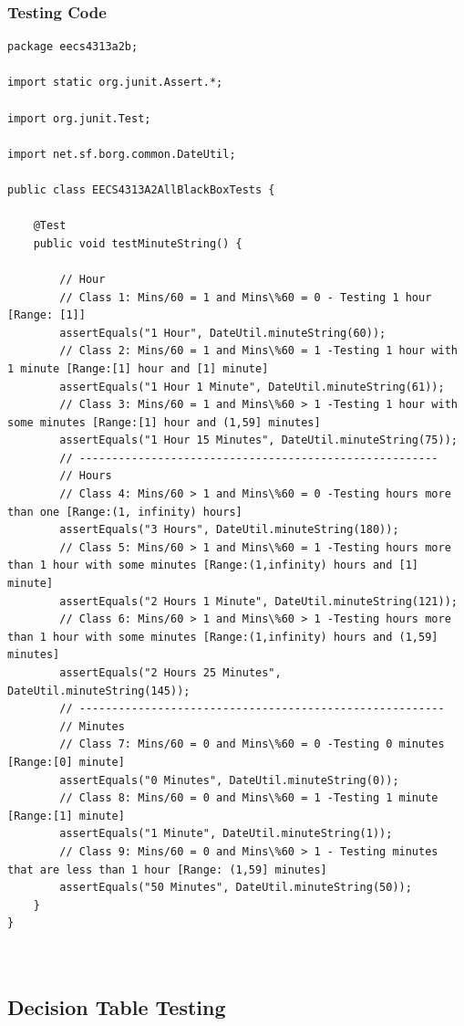 \documentclass[fontsize=12pt,paper=letter,twoside]{scrartcl}
\begin{document}
\subsubsection{Testing Code}
\begin{lstlisting}
package eecs4313a2b;

import static org.junit.Assert.*;

import org.junit.Test;

import net.sf.borg.common.DateUtil;

public class EECS4313A2AllBlackBoxTests {

	@Test
	public void testMinuteString() {

		// Hour
		// Class 1: Mins/60 = 1 and Mins\%60 = 0 - Testing 1 hour [Range: [1]]
		assertEquals("1 Hour", DateUtil.minuteString(60));
		// Class 2: Mins/60 = 1 and Mins\%60 = 1 -Testing 1 hour with 1 minute [Range:[1] hour and [1] minute]
		assertEquals("1 Hour 1 Minute", DateUtil.minuteString(61));
		// Class 3: Mins/60 = 1 and Mins\%60 > 1 -Testing 1 hour with some minutes [Range:[1] hour and (1,59] minutes]
		assertEquals("1 Hour 15 Minutes", DateUtil.minuteString(75));
		// -------------------------------------------------------
		// Hours
		// Class 4: Mins/60 > 1 and Mins\%60 = 0 -Testing hours more than one [Range:(1, infinity) hours]
		assertEquals("3 Hours", DateUtil.minuteString(180));
		// Class 5: Mins/60 > 1 and Mins\%60 = 1 -Testing hours more than 1 hour with some minutes [Range:(1,infinity) hours and [1] minute]
		assertEquals("2 Hours 1 Minute", DateUtil.minuteString(121));
		// Class 6: Mins/60 > 1 and Mins\%60 > 1 -Testing hours more than 1 hour with some minutes [Range:(1,infinity) hours and (1,59] minutes]
		assertEquals("2 Hours 25 Minutes", DateUtil.minuteString(145));
		// --------------------------------------------------------
		// Minutes
		// Class 7: Mins/60 = 0 and Mins\%60 = 0 -Testing 0 minutes [Range:[0] minute]
		assertEquals("0 Minutes", DateUtil.minuteString(0));
		// Class 8: Mins/60 = 0 and Mins\%60 = 1 -Testing 1 minute [Range:[1] minute]
		assertEquals("1 Minute", DateUtil.minuteString(1));
		// Class 9: Mins/60 = 0 and Mins\%60 > 1 - Testing minutes that are less than 1 hour [Range: (1,59] minutes]
		assertEquals("50 Minutes", DateUtil.minuteString(50));
	}
}



\end{lstlisting}

\newpage
\subsection{Decision Table Testing}
\end{document}
